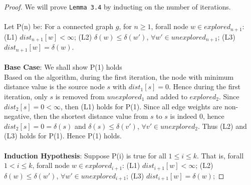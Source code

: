 \documentclass[11pt, oneside]{article}   	%
\newcommand\tab[1][1cm]{\hspace*{#1}}
\theoremstyle{definition}
\begin{document}
\begin{proof}
We will prove \texttt{Lemma 3.4} by inducting on the number of iterations. 
\\\\
Let P(n) be: For a connected graph $g$, for $n \geq 1$, forall node $w \in explored_{n+1}$: (L1) $dist_{n+1}[w] < \infty$; (L2) $\delta(w) \leq \delta(w')$, $\forall w' \in unexplored_{n+1}$; (L3) $dist_{n+1}[w] = \delta(w)$. 
\tab\\\\
\textbf{Base Case}: We shall show P(1) holds \\
Based on the algorithm, during the first iteration, the node with minimum distance value is the source node $s$ with $dist_1[s] = 0$. Hence during the first iteration, only $s$ is removed from $unexplored_1$ and added to $explored_2$. Since $dist_2[s] = 0 < \infty$, then (L1) holds for P(1). Since all edge weights are non-negative, then the shortest distance value from $s$ to $s$ is indeed $0$, hence $dist_2[s] = 0 = \delta(s)$ and $\delta(s) \leq \delta(v')$, $\forall v' \in unexplored_2$. Thus (L2) and (L3) holds for P(1). Hence P(1) holds.
\\\\
\textbf{Induction Hypothesis}: Suppose P(i) is true for all $1 \leq i \leq k$. That is, forall $1 < i \leq k$, forall node $w \in explored_{i+1}$: (L1) $dist_{i+1}[w] < \infty$; (L2) $\delta(w) \leq \delta(w')$, $\forall w' \in unexplored_{i+1}$; (L3) $dist_{i+1}[w] = \delta(w)$; 

\end{proof}
\end{document}
